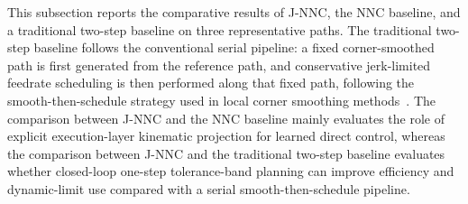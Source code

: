 \documentclass[preprint,12pt]{elsarticle}
\begin{document}
This subsection reports the comparative results of J-NNC, the NNC baseline, and a traditional two-step baseline on three representative paths. The traditional two-step baseline follows the conventional serial pipeline: a fixed corner-smoothed path is first generated from the reference path, and conservative jerk-limited feedrate scheduling is then performed along that fixed path, following the smooth-then-schedule strategy used in local corner smoothing methods~\cite{Sencer2014}. The comparison between J-NNC and the NNC baseline mainly evaluates the role of explicit execution-layer kinematic projection for learned direct control, whereas the comparison between J-NNC and the traditional two-step baseline evaluates whether closed-loop one-step tolerance-band planning can improve efficiency and dynamic-limit use compared with a serial smooth-then-schedule pipeline.

\begin{table}[H]
\centering
\caption{Performance on representative test paths for the NNC baseline, the traditional two-step baseline, and J-NNC.}
\label{tab:main_results}
\end{table}
\end{document}
